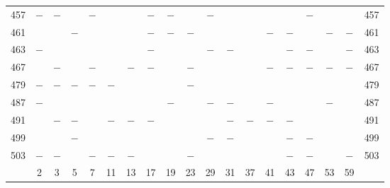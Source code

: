 \begin{center}
\begin{tabular}{r|c|c|c|c|c|c|c|c|c|c|c|c|c|c|c|c|c|r}
457 & $-$ & $-$ &  & $-$ &  &  & $-$ & $-$ &  & $-$ &  &  &  &  & $-$ &  &  & 457\\
461 &  &  & $-$ &  &  &  & $-$ & $-$ & $-$ &  &  &  & $-$ & $-$ &  & $-$ & $-$ & 461\\
463 & $-$ &  &  &  &  &  & $-$ &  &  & $-$ & $-$ &  &  & $-$ & $-$ &  & $-$ & 463\\
467 &  & $-$ &  & $-$ &  & $-$ & $-$ &  & $-$ &  &  &  & $-$ & $-$ & $-$ & $-$ & $-$ & 467\\
479 & $-$ & $-$ & $-$ & $-$ & $-$ &  &  &  & $-$ &  &  &  &  &  &  &  &  & 479\\
487 & $-$ &  &  &  &  &  &  & $-$ &  & $-$ & $-$ &  & $-$ &  &  & $-$ &  & 487\\
491 &  & $-$ & $-$ &  & $-$ & $-$ & $-$ &  &  &  & $-$ & $-$ & $-$ & $-$ &  &  &  & 491\\
499 &  &  & $-$ &  &  &  &  &  &  & $-$ & $-$ &  &  & $-$ & $-$ &  &  & 499\\
503 & $-$ & $-$ &  & $-$ & $-$ & $-$ &  &  & $-$ &  &  &  &  & $-$ & $-$ &  & $-$ & 503\\
\hline
 & 2 & 3 & 5 & 7 & 11 & 13 & 17 & 19 & 23 & 29 & 31 & 37 & 41 & 43 & 47 & 53 & 59 & \\
\hline
\end{tabular}\endgroup\end{center}
\clearpage
